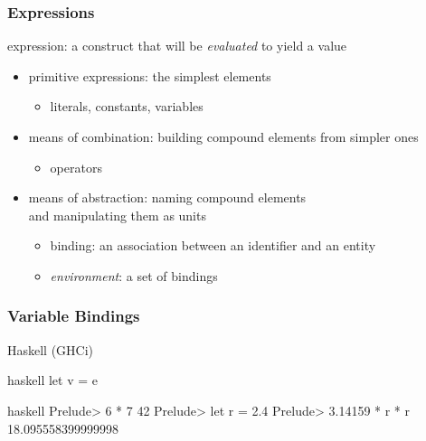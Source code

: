 \documentclass[dvipsnames]{beamer}
\theoremstyle{plain}
\begin{document}
\begin{frame}
  \frametitle{Expressions}

  \begin{definition}
    \alert{expression}: a construct that will be \emph{evaluated} to yield a value
  \end{definition}

  \pause
  \medskip
  \begin{itemize}
    \item primitive expressions: the simplest elements\\
    \begin{itemize}
      \item literals, constants, variables
    \end{itemize}
    \item means of combination: building compound elements from simpler ones\\
    \begin{itemize}
      \item operators
    \end{itemize}
    \item means of abstraction: naming compound elements\\
      and manipulating them as units
    \begin{itemize}
      \item \alert{binding}: an association between an identifier and an entity
      \item \emph{environment}: a set of bindings
    \end{itemize}
  \end{itemize}
\end{frame}

\begin{frame}[fragile]
  \frametitle{Variable Bindings}

  \begin{block}{Haskell (GHCi)}
    \begin{pygments}{haskell}
let v = e
    \end{pygments}
  \end{block}

  \pause
  \begin{example}[Haskell]
    \begin{pygments}{haskell}
Prelude> 6 * 7
42
Prelude> let r = 2.4
Prelude> 3.14159 * r * r
18.095558399999998
    \end{pygments}
  \end{example}
\end{frame}
\end{document}
